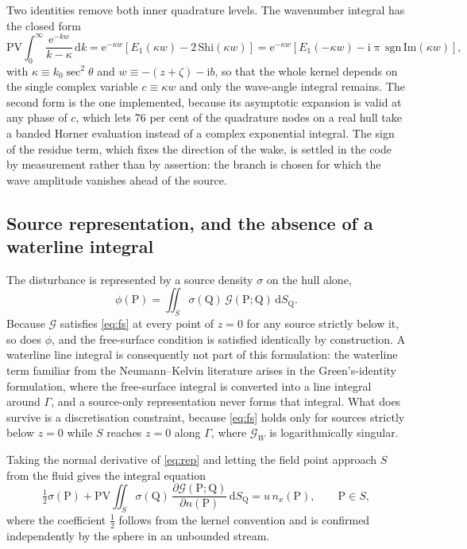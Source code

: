 \documentclass[11pt]{article}
\begin{document}
Two identities remove both inner quadrature levels. The wavenumber integral has the closed
form
\begin{equation}
\mathrm{PV}\!\!\int_0^\infty \frac{\mathrm{e}^{-kw}}{k-\kappa}\,\mathrm{d}k
= \mathrm{e}^{-\kappa w}\left[E_1(\kappa w) - 2\,\mathrm{Shi}(\kappa w)\right]
= \mathrm{e}^{-\kappa w}\left[E_1(-\kappa w)
- \mathrm{i}\uppi\,\mathrm{sgn}\,\mathrm{Im}(\kappa w)\right],
\label{eq:identity}
\end{equation}
with $\kappa \equiv k_0\sec^2\theta$ and $w \equiv -(z+\zeta) - \mathrm{i}b$, so that the
whole kernel depends on the single complex variable $c \equiv \kappa w$ and only the
wave-angle integral remains. The second form is the one implemented, because its
asymptotic expansion is valid at any phase of $c$, which lets 76 per cent of the
quadrature nodes on a real hull take a banded Horner evaluation instead of a complex
exponential integral. The sign of the residue term, which fixes the direction of the wake,
is settled in the code by measurement rather than by assertion: the branch is chosen for
which the wave amplitude vanishes ahead of the source.

\subsection{Source representation, and the absence of a waterline integral}

The disturbance is represented by a source density $\sigma$ on the hull alone,
\begin{equation}
\phi(\mathrm{P}) = \iint_S \sigma(\mathrm{Q})\,\mathcal{G}(\mathrm{P};\mathrm{Q})\,
\mathrm{d}S_\mathrm{Q}.
\label{eq:rep}
\end{equation}
Because $\mathcal{G}$ satisfies \eqref{eq:fs} at every point of $z=0$ for any source
strictly below it, so does $\phi$, and the free-surface condition is satisfied identically
by construction. A waterline line integral is consequently not part of this formulation:
the waterline term familiar from the Neumann--Kelvin literature arises in the
Green's-identity formulation, where the free-surface integral is converted into a line
integral around $\Gamma$, and a source-only representation never forms that integral. What
does survive is a discretisation constraint, because \eqref{eq:fs} holds only for sources
strictly below $z=0$ while $S$ reaches $z=0$ along $\Gamma$, where $\mathcal{G}_W$ is
logarithmically singular.

Taking the normal derivative of \eqref{eq:rep} and letting the field point approach $S$
from the fluid gives the integral equation
\begin{equation}
\tfrac{1}{2}\sigma(\mathrm{P}) + \mathrm{PV}\!\!\iint_S \sigma(\mathrm{Q})\,
\frac{\partial\mathcal{G}(\mathrm{P};\mathrm{Q})}{\partial n(\mathrm{P})}\,
\mathrm{d}S_\mathrm{Q} = u\,n_x(\mathrm{P}), \qquad \mathrm{P}\in S,
\label{eq:integral}
\end{equation}
where the coefficient $\tfrac{1}{2}$ follows from the kernel convention and is confirmed
independently by the sphere in an unbounded stream.
\end{document}
